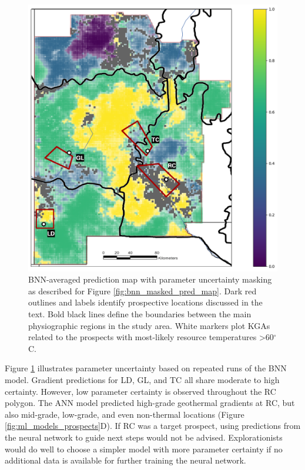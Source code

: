 \begin{figure}
\centering
\includegraphics[width=.75\textwidth]{templates/images/Figure-BNN_All_Gradient_Map_Masked_Prospect_Zones.png}
\caption[Parameter uncertainty map with prospective areas]
{BNN-averaged prediction map with parameter uncertainty masking as described for Figure \ref{fig:bnn_masked_pred_map}. Dark red outlines and labels identify prospective locations discussed in the text. Bold black lines define the boundaries between the main physiographic regions in the study area. White markers plot KGAs related to the prospects with most-likely resource temperatures >60$^\circ$C.}
\label{fig:param_uncertainty_prospects}
\end{figure}

Figure \ref{fig:param_uncertainty_prospects} illustrates parameter uncertainty based on repeated runs of the BNN model. Gradient predictions for LD, GL, and TC all share moderate to high certainty. However, low parameter certainty is observed throughout the RC polygon. The ANN model predicted high-grade geothermal gradients at RC, but also mid-grade, low-grade, and even non-thermal locations (Figure \ref{fig:ml_models_prospects}D). If RC was a target prospect, using predictions from the neural network to guide next steps would not be advised. Explorationists would do well to choose a simpler model with more parameter certainty if no additional data is available for further training the neural network.

